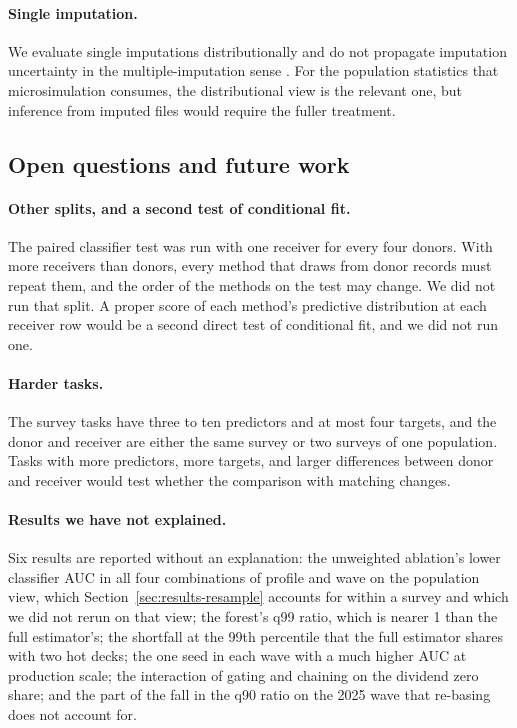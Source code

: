 \paragraph{Single imputation.} We evaluate single imputations
distributionally and do not propagate imputation uncertainty in the
multiple-imputation sense \citep{rubin1987multiple}. For the population
statistics that microsimulation consumes, the distributional view is the
relevant one, but inference from imputed files would require the fuller
treatment.

\subsection{Open questions and future work}
\label{sec:future}

\paragraph{Other splits, and a second test of conditional fit.} The paired
classifier test was run with one receiver for every four donors. With more
receivers than donors, every method that draws from donor records must
repeat them, and the order of the methods on the test may change. We did not
run that split. A proper score of each method's predictive distribution at
each receiver row would be a second direct test of conditional fit, and we
did not run one.

\paragraph{Harder tasks.} The survey tasks have three to ten predictors and
at most four targets, and the donor and receiver are either the same survey
or two surveys of one population. Tasks with more predictors, more targets,
and larger differences between donor and receiver would test whether the
comparison with matching changes.

\paragraph{Results we have not explained.} Six results are reported without
an explanation: the unweighted ablation's lower classifier AUC in all four
combinations of profile and wave on the population view, which
Section~\ref{sec:results-resample} accounts for within a survey and which we
did not rerun on that view; the \microimpute{} forest's q99 ratio,
which is nearer 1 than the full estimator's; the shortfall at the 99th
percentile that the full estimator shares with two hot decks; the one seed
in each wave with a much higher AUC at production scale; the interaction of
gating and chaining on the dividend zero share; and the part of the fall in
the q90 ratio on the 2025 wave that re-basing does not account for.

